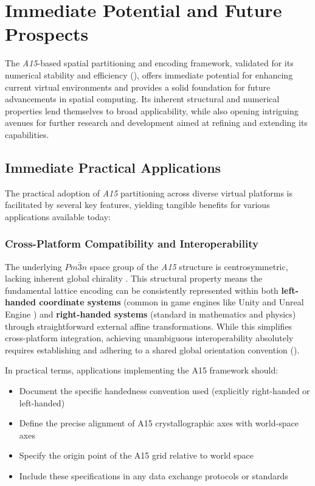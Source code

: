 \documentclass[10pt]{article}
\def\AAAB{\textit{A15}}
\begin{document}
\section{Immediate Potential and Future Prospects}\label{sec-outlook}

The \AAAB{}-based spatial partitioning and encoding framework, validated for its numerical stability and efficiency (), offers immediate potential for enhancing current virtual environments and provides a solid foundation for future advancements in spatial computing. Its inherent structural and numerical properties lend themselves to broad applicability, while also opening intriguing avenues for further research and development aimed at refining and extending its capabilities.

\subsection{Immediate Practical Applications}\label{subsec-applications}

The practical adoption of \AAAB{} partitioning across diverse virtual platforms is facilitated by several key features, yielding tangible benefits for various applications available today:

\subsubsection{Cross-Platform Compatibility and Interoperability}\label{subsubsec-apps-coordsys}
The underlying $Pm\bar{3}n$ space group of the \AAAB{} structure is centrosymmetric, lacking inherent global chirality \cite{ITCVolumeA2016}. This structural property means the fundamental lattice encoding can be consistently represented within both \textbf{left-handed coordinate systems} (common in game engines like Unity \cite{UnityCoords} and Unreal Engine \cite{UnrealCoords}) and \textbf{right-handed systems} (standard in mathematics and physics) through straightforward external affine transformations. While this simplifies cross-platform integration, achieving unambiguous interoperability absolutely requires establishing and adhering to a shared global orientation convention ().

In practical terms, applications implementing the A15 framework should:
\begin{itemize} \itemsep0pt
    \item Document the specific handedness convention used (explicitly right-handed or left-handed)
    \item Define the precise alignment of A15 crystallographic axes with world-space axes
    \item Specify the origin point of the A15 grid relative to world space
    \item Include these specifications in any data exchange protocols or standards
\end{itemize}
\end{document}

